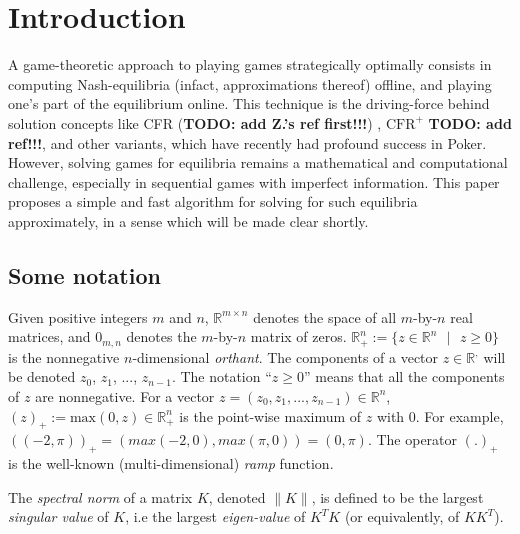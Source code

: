 \documentclass[12pt]{article}
\begin{document}
\section{Introduction}
\label{sec:intro}
A game-theoretic approach to playing games strategically optimally consists in computing Nash-equilibria (infact, approximations thereof) offline, and playing one's part of the equilibrium online. This technique is the driving-force behind solution concepts like CFR (\textbf{TODO: add Z.'s ref first!!!}) \cite{lanctot2009monte}, $\text{CFR}^{+}$ \textbf{TODO: add ref!!!}, and other variants, which have recently had profound success in Poker. However, solving games for equilibria remains a mathematical and computational challenge, especially in sequential games with imperfect information. This paper proposes a simple and fast algorithm for solving for such equilibria approximately, in a sense which will be made clear shortly.

\subsection{Some notation}
Given positive integers $m$ and $n$, $\mathbb{R}^{m \times n}$ denotes
the space of all $m$-by-$n$ real matrices, and $0_{m,n}$ denotes the $m$-by-$n$ matrix of zeros.
$\mathbb{R}^{n}_+ := \{z \in \mathbb{R}^{n}\text{ }|\text{ } z \geq 0\}$ is the nonnegative $n$-dimensional \textit{orthant}.  The components of a vector $z \in \mathbb{R}^,$ will be denoted $z_0$, $z_1$, ..., $z_{n-1}$. The notation ``$z \ge 0$'' means that all the components of $z$ are nonnegative. For a vector $z = (z_0, z_1, ..., z_{n-1}) \in \mathbb{R}^n$, %
$(z)_+:=\text{max}(0, z) \in \mathbb{R}^{n}_+$ is the point-wise maximum of $z$ with 0. For example, $((-2, \pi))_+ = (max(-2, 0), max(\pi, 0)) = (0, \pi)$.  The operator $(.)_+$ is the well-known (multi-dimensional) \textit{ramp} function.

The \textit{spectral norm} of a matrix $K$, denoted $\|K\|$, is defined to be the largest \textit{singular value} of $K$, i.e the largest \textit{eigen-value} of $K^TK$ (or equivalently, of $KK^T$).
\end{document}
